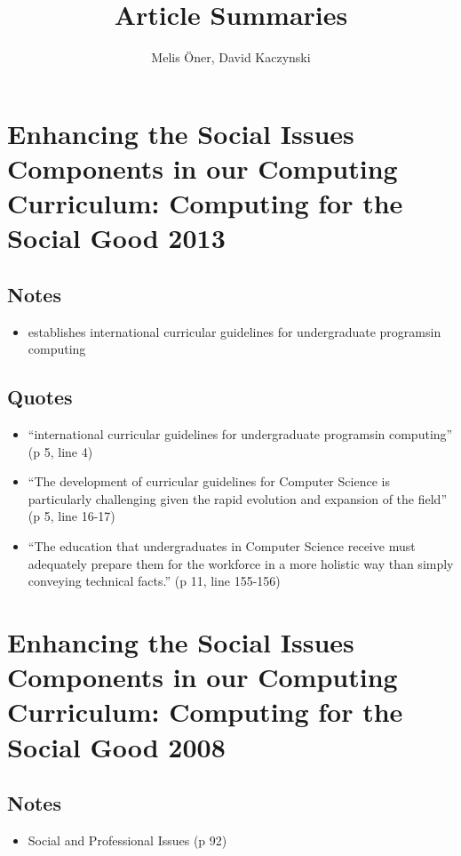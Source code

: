 \documentclass[]{article}
\title{Article Summaries}
\author{Melis \"{O}ner, David Kaczynski}
\begin{document}
\maketitle

\section{Enhancing the Social Issues Components in our Computing Curriculum:
Computing for the Social Good 2013}

\subsection{Notes}

\begin{itemize}
  \item establishes international curricular guidelines for undergraduate
  programsin computing
\end{itemize}

\subsection{Quotes}

\begin{itemize}
  \item ``international curricular guidelines for undergraduate
  programsin computing'' (p 5, line 4)
  \item ``The development of curricular guidelines for Computer Science is
  particularly challenging given the rapid evolution and expansion of the
  field'' (p 5, line 16-17)
  \item ``The education that undergraduates in Computer Science receive must
  adequately prepare them for the workforce in a more holistic way than simply
  conveying technical facts.'' (p 11, line 155-156)
  
\end{itemize}

\section{Enhancing the Social Issues Components in our Computing Curriculum:
Computing for the Social Good 2008}

\subsection{Notes}

\begin{itemize}
  \item Social and Professional Issues (p 92)
\end{itemize}
\end{document}
